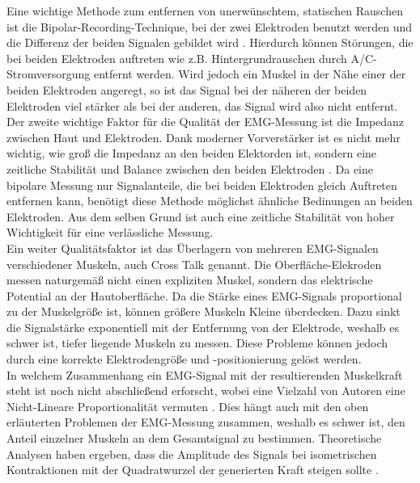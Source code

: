 Eine wichtige Methode zum entfernen von unerwünschtem, statischen Rauschen ist die Bipolar-Recording-Technique, bei der zwei Elektroden benutzt werden und die Differenz der beiden Signalen gebildet wird \citep{Day.2000}. Hierdurch können Störungen, die bei beiden Elektroden auftreten wie z.B. Hintergrundrauschen durch A/C-Stromversorgung entfernt werden. Wird jedoch ein Muskel in der Nähe einer der beiden Elektroden angeregt, so ist das Signal bei der näheren der beiden Elektroden viel stärker als bei der anderen, das Signal wird also nicht entfernt.\\

Der zweite wichtige Faktor für die Qualität der EMG-Messung ist die Impedanz zwischen Haut und Elektroden. Dank moderner Vorverstärker ist es nicht mehr wichtig, wie groß die Impedanz an den beiden Elektorden ist, sondern eine zeitliche Stabilität und Balance zwischen den beiden Elektroden \citep{Hermens.1999}. Da eine bipolare Messung nur Signalanteile, die bei beiden Elektroden gleich Auftreten entfernen kann, benötigt diese Methode möglichst ähnliche Bedinungen an beiden Elektroden. Aus dem selben Grund ist auch eine zeitliche Stabilität von hoher Wichtigkeit für eine verlässliche Messung. \\

Ein weiter Qualitätsfaktor ist das Überlagern von mehreren EMG-Signalen verschiedener Muskeln, auch Cross Talk genannt. Die Oberfläche-Elekroden messen naturgemäß nicht einen expliziten Muskel, sondern das elektrische Potential an der Hautoberfläche. Da die Stärke eines EMG-Signals proportional zu der Muskelgröße ist, können größere Muskeln Kleine überdecken. Dazu sinkt die Signalstärke exponentiell mit der Entfernung von der Elektrode, weshalb es schwer ist, tiefer liegende Muskeln zu messen. Diese Probleme können jedoch durch eine korrekte Elektrodengröße und -positionierung gelöst werden. \\

In welchem Zusammenhang ein EMG-Signal mit der resultierenden Muskelkraft steht ist noch nicht abschließend erforscht, wobei eine Vielzahl von Autoren eine Nicht-Lineare Proportionalität vermuten \citep{Karlsson.2001,Gregor.2002,Bilodeau.2003}. Dies hängt auch mit den oben erläuterten Problemen der EMG-Messung zusammen, weshalb es schwer ist, den Anteil einzelner Muskeln an dem Gesamtsignal zu bestimmen. Theoretische Analysen haben ergeben, dass die Amplitude des Signals bei isometrischen Kontraktionen mit der Quadratwurzel der generierten Kraft steigen sollte \citep{Uliam.2012,Basmajian.1985}. \\

